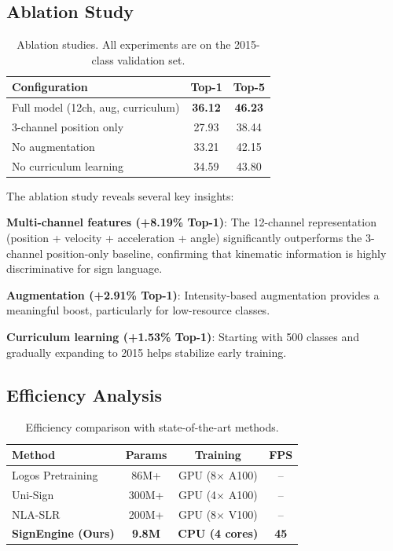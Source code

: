 \documentclass[conference]{IEEEtran}
\begin{document}
\subsection{Ablation Study}

\begin{table}[htbp]
\centering
\caption{Ablation studies. All experiments are on the 2015-class validation set.}
\label{tab:ablation}
\begin{tabular}{lcc}
\toprule
\textbf{Configuration} & \textbf{Top-1} & \textbf{Top-5} \\
\midrule
Full model (12ch, aug, curriculum) & \textbf{36.12} & \textbf{46.23} \\
3-channel position only & 27.93 & 38.44 \\
No augmentation & 33.21 & 42.15 \\
No curriculum learning & 34.59 & 43.80 \\
\bottomrule
\end{tabular}
\end{table}

The ablation study reveals several key insights:

\textbf{Multi-channel features (+8.19\% Top-1)}: The 12-channel representation (position + velocity + acceleration + angle) significantly outperforms the 3-channel position-only baseline, confirming that kinematic information is highly discriminative for sign language.

\textbf{Augmentation (+2.91\% Top-1)}: Intensity-based augmentation provides a meaningful boost, particularly for low-resource classes.

\textbf{Curriculum learning (+1.53\% Top-1)}: Starting with 500 classes and gradually expanding to 2015 helps stabilize early training.

\subsection{Efficiency Analysis}

\begin{table}[htbp]
\centering
\caption{Efficiency comparison with state-of-the-art methods.}
\label{tab:efficiency}
\begin{tabular}{lccc}
\toprule
\textbf{Method} & \textbf{Params} & \textbf{Training} & \textbf{FPS} \\
\midrule
Logos Pretraining & 86M+ & GPU (8$\times$ A100) & -- \\
Uni-Sign & 300M+ & GPU (4$\times$ A100) & -- \\
NLA-SLR & 200M+ & GPU (8$\times$ V100) & -- \\
\textbf{SignEngine (Ours)} & \textbf{9.8M} & \textbf{CPU (4 cores)} & \textbf{45} \\
\bottomrule
\end{tabular}
\end{table}
\end{document}
